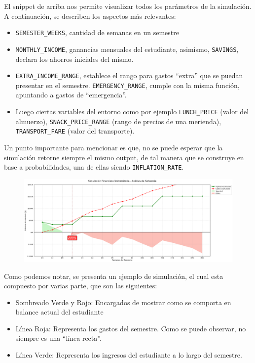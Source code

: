 \documentclass[letterpaper, 11pt]{report}
\begin{document}
El snippet de arriba nos permite visualizar todos los parámetros de la
simulación. A continuación, se describen los aspectos más relevantes:

\begin{itemize}
      \item \texttt{SEMESTER\_WEEKS}, cantidad de semanas en un semestre
      \item \texttt{MONTHLY\_INCOME}, ganancias mensuales del estudiante, asimismo, \texttt{SAVINGS}, declara los ahorros iniciales del mismo.
      \item \texttt{EXTRA\_INCOME\_RANGE}, establece el rango para gastos “extra” que se puedan presentar en el semestre. \texttt{EMERGENCY\_RANGE}, cumple con la misma función, apuntando a gastos de “emergencia”.
      \item Luego ciertas variables del entorno como por ejemplo \texttt{LUNCH\_PRICE}
            (valor del almuerzo), \texttt{SNACK\_PRICE\_RANGE} (rango de precios de una
            merienda), \texttt{TRANSPORT\_FARE} (valor del transporte).
\end{itemize}

Un punto importante para mencionar es que, no se puede esperar que la
simulación retorne siempre el mismo output, de tal manera que se construye en
base a probabilidades, una de ellas siendo \texttt{INFLATION\_RATE}.

\begin{figure}[H]
      \begin{center}
            \includegraphics[width=\linewidth]{./Images/output_sample.png}
            \caption{}
      \end{center}
\end{figure}

Como podemos notar, se presenta un ejemplo de simulación, el cual esta
compuesto por varias parte, que son las siguientes:

\begin{itemize}
      \item Sombreado Verde y Rojo: Encargados de mostrar como se comporta en balance
            actual del estudiante
      \item Línea Roja: Representa los gastos del semestre. Como se puede observar, no
            siempre es una ``línea recta''.
      \item Línea Verde: Representa los ingresos del estudiante a lo largo del semestre.
\end{itemize}
\end{document}
